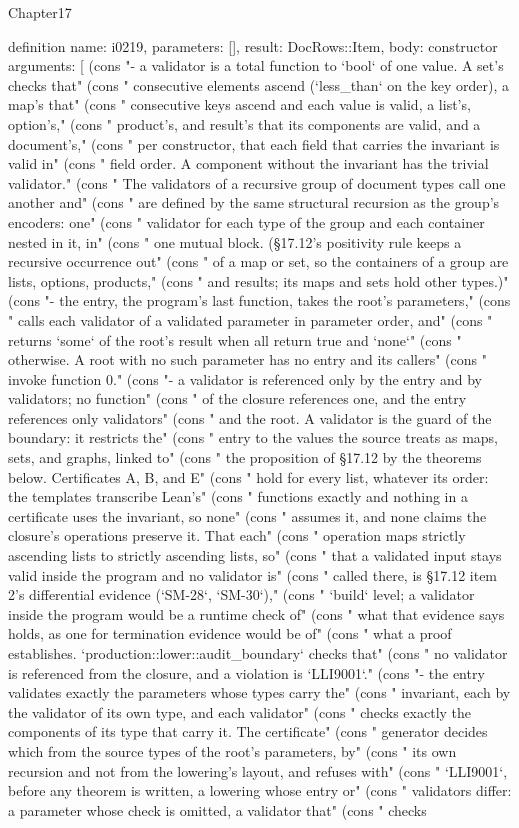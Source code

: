 \begin{lexlean}{Chapter17}
\begin{semanticmodule}
definition{
  name: i0219,
  parameters: [],
  result: DocRows::Item,
  body: constructor{
    arguments: [
      (cons "- a validator is a total function to `bool` of one value. A set's checks that" (cons "  consecutive elements ascend (`less_than` on the key order), a map's that" (cons "  consecutive keys ascend and each value is valid, a list's, option's," (cons "  product's, and result's that its components are valid, and a document's," (cons "  per constructor, that each field that carries the invariant is valid in" (cons "  field order. A component without the invariant has the trivial validator." (cons "  The validators of a recursive group of document types call one another and" (cons "  are defined by the same structural recursion as the group's encoders: one" (cons "  validator for each type of the group and each container nested in it, in" (cons "  one mutual block. (§17.12's positivity rule keeps a recursive occurrence out" (cons "  of a map or set, so the containers of a group are lists, options, products," (cons "  and results; its maps and sets hold other types.)" (cons "- the entry, the program's last function, takes the root's parameters," (cons "  calls each validator of a validated parameter in parameter order, and" (cons "  returns `some` of the root's result when all return true and `none`" (cons "  otherwise. A root with no such parameter has no entry and its callers" (cons "  invoke function 0." (cons "- a validator is referenced only by the entry and by validators; no function" (cons "  of the closure references one, and the entry references only validators" (cons "  and the root. A validator is the guard of the boundary: it restricts the" (cons "  entry to the values the source treats as maps, sets, and graphs, linked to" (cons "  the proposition of §17.12 by the theorems below. Certificates A, B, and E" (cons "  hold for every list, whatever its order: the templates transcribe Lean's" (cons "  functions exactly and nothing in a certificate uses the invariant, so none" (cons "  assumes it, and none claims the closure's operations preserve it. That each" (cons "  operation maps strictly ascending lists to strictly ascending lists, so" (cons "  that a validated input stays valid inside the program and no validator is" (cons "  called there, is §17.12 item 2's differential evidence (`SM-28`, `SM-30`)," (cons "  `build` level; a validator inside the program would be a runtime check of" (cons "  what that evidence says holds, as one for termination evidence would be of" (cons "  what a proof establishes. `production::lower::audit_boundary` checks that" (cons "  no validator is referenced from the closure, and a violation is `LLI9001`." (cons "- the entry validates exactly the parameters whose types carry the" (cons "  invariant, each by the validator of its own type, and each validator" (cons "  checks exactly the components of its type that carry it. The certificate" (cons "  generator decides which from the source types of the root's parameters, by" (cons "  its own recursion and not from the lowering's layout, and refuses with" (cons "  `LLI9001`, before any theorem is written, a lowering whose entry or" (cons "  validators differ: a parameter whose check is omitted, a validator that" (cons "  checks }}
\end{semanticmodule}
\end{lexlean}
